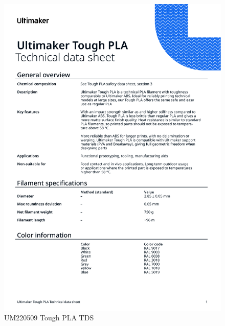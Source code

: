 \begin{figure}[H]
    \centering
    \includegraphics[width=\textwidth]{Images/UM220509-Tough-PLA-TDS-RB-v2.10.pdf}
    \caption{UM220509 Tough PLA TDS}
    \label{fig:tough_PLA}
\end{figure}
